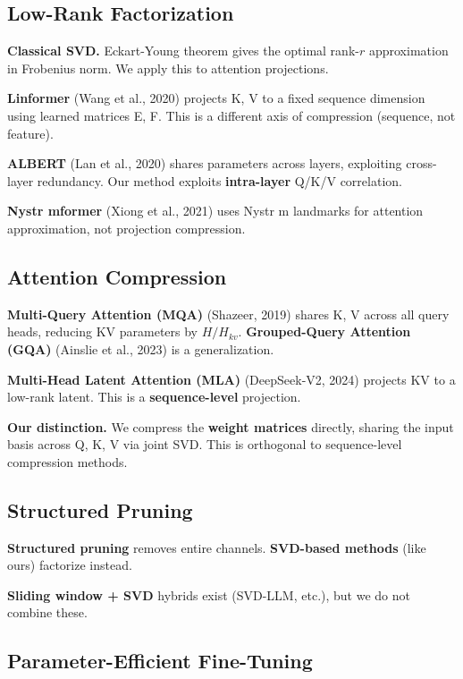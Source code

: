 \subsection{Low-Rank Factorization}

\textbf{Classical SVD.} Eckart-Young theorem gives the optimal rank-$r$ 
approximation in Frobenius norm. We apply this to attention projections.

\textbf{Linformer} (Wang et al., 2020) projects K, V to a fixed sequence dimension 
using learned matrices E, F. This is a different axis of compression 
(sequence, not feature).

\textbf{ALBERT} (Lan et al., 2020) shares parameters across layers, exploiting 
cross-layer redundancy. Our method exploits \textbf{intra-layer} Q/K/V correlation.

\textbf{Nystr mformer} (Xiong et al., 2021) uses Nystr m landmarks for attention 
approximation, not projection compression.

\subsection{Attention Compression}

\textbf{Multi-Query Attention (MQA)} (Shazeer, 2019) shares K, V across all query 
heads, reducing KV parameters by $H/H_{kv}$. \textbf{Grouped-Query Attention (GQA)} 
(Ainslie et al., 2023) is a generalization.

\textbf{Multi-Head Latent Attention (MLA)} (DeepSeek-V2, 2024) projects KV to a 
low-rank latent. This is a \textbf{sequence-level} projection.

\textbf{Our distinction.} We compress the \textbf{weight matrices} directly, sharing 
the input basis across Q, K, V via joint SVD. This is orthogonal to 
sequence-level compression methods.

\subsection{Structured Pruning}

\textbf{Structured pruning} removes entire channels. \textbf{SVD-based methods} 
(like ours) factorize instead.

\textbf{Sliding window + SVD} hybrids exist (SVD-LLM, etc.), but we do not 
combine these.

\subsection{Parameter-Efficient Fine-Tuning}

